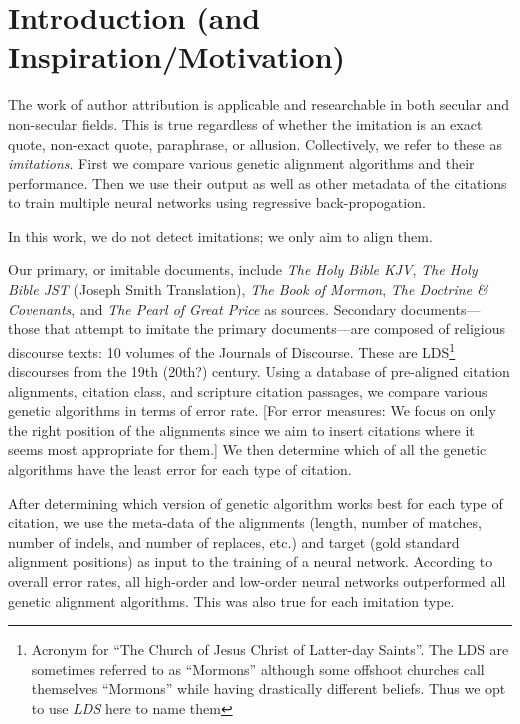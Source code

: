 \section {Introduction (and Inspiration/Motivation)}

The work of author attribution is applicable and researchable in both secular and non-secular fields. This is true regardless of whether the imitation is an exact quote, non-exact quote, paraphrase, or allusion. Collectively, we refer to these as \textit{imitations}. First we compare various genetic alignment algorithms and their performance. Then we use their output as well as other metadata of the citations to train multiple neural networks using regressive back-propogation. 

In this work, we do not detect imitations; we only aim to align them. 

Our primary, or imitable documents, include \textit{The Holy Bible KJV}, \textit{The Holy Bible JST} (Joseph Smith Translation), \textit{The Book of Mormon}, \textit{The Doctrine \& Covenants}, and \textit{The Pearl of Great Price} as sources. Secondary documents---those that attempt to imitate the primary documents---are composed of religious discourse texts: 10 volumes of the Journals of Discourse. These are LDS\footnote{Acronym for ``The Church of Jesus Christ of Latter-day Saints''. The LDS are sometimes referred to as ``Mormons'' although some offshoot churches call themselves ``Mormons'' while having drastically different beliefs. Thus we opt to use \textit{LDS} here to name them} discourses from the 19th (20th?) century. Using a database of pre-aligned citation alignments, citation class, and scripture citation passages, we compare various genetic algorithms in terms of error rate. %
[For error measures: We focus on only the right position of the alignments since we aim to insert citations where it seems most appropriate for them.] We then determine which of all the genetic algorithms have the least error for each type of citation.

After determining which version of genetic algorithm works best for each type of citation, we use the meta-data of the alignments (length, number of matches, number of indels, and number of replaces, etc.) and target (gold standard alignment positions) as input to the training of a neural network. %
According to overall error rates, all high-order and low-order neural networks outperformed all genetic alignment algorithms. This was also true for each imitation type.

